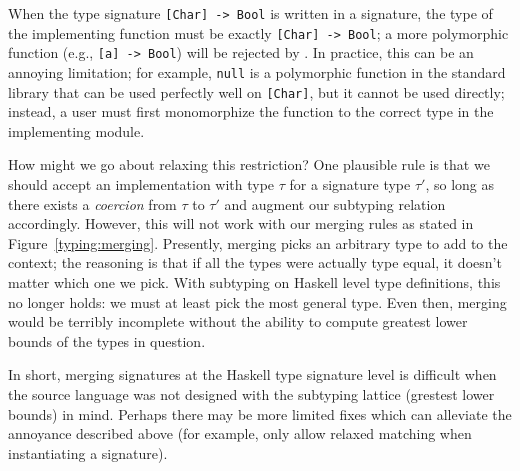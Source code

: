 When the type signature \verb|[Char] -> Bool| is written in a signature,
the type of the implementing function must be exactly \verb|[Char] -> Bool|;
a more polymorphic function (e.g., \verb|[a] -> Bool|) will be rejected
by \Backpack{}.
In practice, this can be an annoying limitation; for example, \verb|null|
is a polymorphic function in the standard library that can be used
perfectly well on \verb|[Char]|, but it cannot be used directly; instead,
a user must first monomorphize the function to the correct type in the
implementing module.

How might we go about relaxing this restriction?  One plausible rule is
that we should accept an implementation with type $\tau$ for a signature
type $\tau'$, so long as there exists a \emph{coercion} from $\tau$ to
$\tau'$ and augment our subtyping relation accordingly.  However, this will
not work with our merging rules as stated in Figure~\ref{typing:merging}.
Presently, merging picks an arbitrary type to add to the context; the reasoning
is that if all the types were actually type equal, it doesn't matter which
one we pick.  With subtyping on Haskell level type definitions, this no
longer holds: we must at least pick the most general type.  Even then,
merging would be terribly incomplete without the ability to compute
greatest lower bounds of the types in question.

In short, merging signatures at the Haskell type signature level is difficult
when the source language was not designed with the subtyping lattice (grestest
lower bounds) in mind.  Perhaps there may be more limited fixes which can
alleviate the annoyance described above (for example, only allow relaxed
matching when instantiating a signature).
